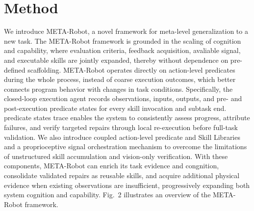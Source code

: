 \documentclass{article} %
\begin{document}
\section{Method}
We introduce META-Robot, a novel framework for meta-level generalization to a new task. The META-Robot framework is grounded in the scaling of cognition and capability, where evaluation criteria, feedback acquisition, avaliable signal, and executable skills are jointly expanded, thereby without dependence on pre-defined scaffolding. META-Robot operates directly on  action-level predicates during the whole process, instead of coarse execution outcomes, which better connects program behavior with changes in task conditions. Specifically, the closed-loop execution agent records observations, inputs, outputs, and pre- and post-execution predicate states for every skill invocation and subtask end. predicate states trace enables the system to consistently assess progress, attribute failures, and verify targeted repairs through local re-execution before full-task validation. We also introduce coupled action-level predicate and Skill Libraries and a proprioceptive signal orchestration mechanism to overcome the limitations of unstructured skill accumulation and vision-only verification. With these components, META-Robot can enrich its task evidence and congnition, consolidate validated repairs as reusable skills, and acquire additional physical evidence when existing observations are insufficient, progressively expanding both system cognition and capability. Fig.~2 illustrates an overview of the META-Robot framework.
\end{document}
